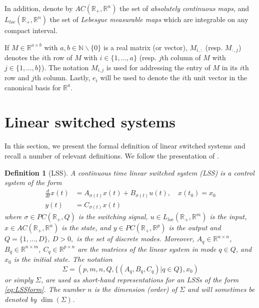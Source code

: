 \documentclass[journal]{IEEEtran}
\newtheorem{Definition}{Definition}
\begin{document}
In addition, denote by $AC(\mathbb{R}_+, \mathbb R^n)$ the set of \emph{absolutely continuous maps}, and $L_{loc}(\mathbb{R}_+, \mathbb R^n)$ the set of \emph{Lebesgue measurable maps} which are integrable on any compact interval.

If $M \in \mathbb{R}^{a \times b}$ with $a,b \in \mathbb{N} \backslash \{0\}$ is a real matrix (or vector), $M_{i,:}$ (resp. $M_{:,j}$) denotes the $i$th row of $M$ with $i \in \{1, \dots, a\}$ (resp. $j$th column of $M$ with $j \in \{1, \dots, b\}$). The notation $M_{i,j}$ is used for addressing the entry of $M$ in its $i$th row and $j$th column. Lastly, $e_i$ will be used to denote the $i$th unit vector in the canonical basis for $\mathbb{R}^a$.

\section{Linear switched systems}
\label{sect:lin_switch_def}

In this section, we present the formal definition of linear switched systems and recall a number of relevant definitions. We follow the presentation of \cite{MP:BigArticlePartI,petreczky2013}.

\begin{Definition}[LSS] \label{LSS}
	A continuous time linear switched system (LSS) is a control system of the form
	\begin{subequations}\label{eq:LSSform}
		\begin{align} 
			\frac{d}{dt}x(t)&=A_{\sigma(t)}x(t)+B_{\sigma(t)}u(t),\quad x(t_0)=x_0\label{sdyn} \\
			y(t)&=C_{\sigma(t)}x(t)\label{out} 
		\end{align}
	\end{subequations}
	where $ \sigma \in PC(\mathbb{R}_+, Q)$ is the switching signal, $u \in L_{loc}(\mathbb{R}_+, \mathbb R^m)$ is the input, $x \in AC(\mathbb{R}_+, \mathbb R^n)$ is the state, and $y \in PC(\mathbb{R}_+, \mathbb R^p)$ is the output and $Q=\{1,\dots,D\},~D>0,$ is the set of discrete modes. Moreover, $A_q \in \mathbb{R}^{n \times n}$, $B_q \in \mathbb{R}^{n \times m}$, $C_q \in \mathbb{R}^{p \times n}$ are the matrices of the linear system in mode $q \in Q$, and $x_0$ is the initial state. The notation
	\begin{equation}
		\Sigma=(p,m,n,Q,\{(A_q,B_q,C_q)|q \in Q\},x_0) 
	\end{equation}
	or simply $\Sigma$, are used as short-hand representations for an LSSs of the form \eqref{eq:LSSform}. The number $n$ is the \emph{dimension (order) of $\Sigma$} and will sometimes be denoted by $\dim(\Sigma)$.
\end{Definition}
\end{document}

